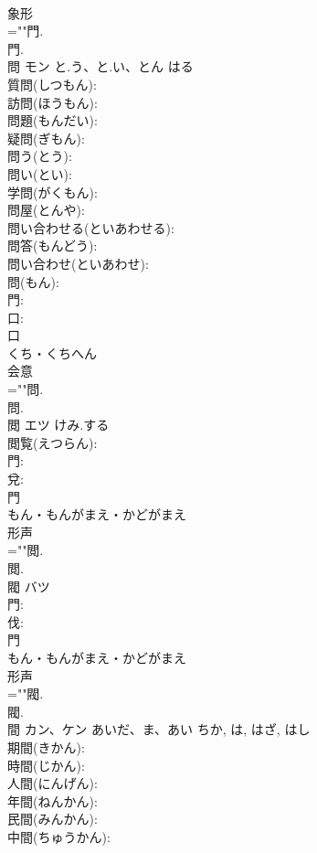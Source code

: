 \documentclass[8pt]{extreport}
\begin{document}
\begin{CJK}{UTF8}{min}
\\	象形 
\\	=""門.
\\	門.
\\	問	モン	と.う、と.い、とん	はる	
\\	質問(しつもん): 
\\	訪問(ほうもん): 
\\	問題(もんだい): 
\\	疑問(ぎもん): 
\\	問う(とう): 
\\	問い(とい): 
\\	学問(がくもん): 
\\	問屋(とんや): 
\\	問い合わせる(といあわせる): 
\\	問答(もんどう): 
\\	問い合わせ(といあわせ): 
\\	問(もん): 
\\	門: 
\\	口: 
\\	口	
\\	くち・くちへん	
\\	会意 
\\	=""問.
\\	問.
\\	閲	エツ	けみ.する		
\\	閲覧(えつらん): 
\\	門: 
\\	兌: 
\\	門	
\\	もん・もんがまえ・かどがまえ	
\\	形声 
\\	=""閲.
\\	閲.
\\	閥	バツ			
\\	門: 
\\	伐: 
\\	門	
\\	もん・もんがまえ・かどがまえ	
\\	形声 
\\	=""閥.
\\	閥.
\\	間	カン、ケン	あいだ、ま、あい	ちか, は, はざ, はし	
\\	期間(きかん): 
\\	時間(じかん): 
\\	人間(にんげん): 
\\	年間(ねんかん): 
\\	民間(みんかん): 
\\	中間(ちゅうかん): 

\end{CJK}
\end{document}
